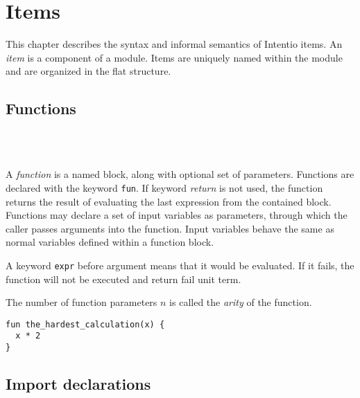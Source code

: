 \chapter{Items}

This chapter describes the syntax and informal semantics of Intentio items. An \emph{item} is a component of a module. Items are uniquely named within the module and are organized in the flat structure.

\begin{bnf}
   \eq    {}    
                \gorln {} 
\end{bnf}

\section{Functions}

\begin{bnf}
   \eq {} \  \ \term{(} \  \ \term{)} \  \\
   \eq {} \  \ \gtry{\term{,}}
\end{bnf}

A \emph{function} is a named block, along with optional set of parameters. Functions are declared with the keyword \lstinline{fun}. If keyword \emph{return} is not used, the function returns the result of evaluating the last expression from the contained block. Functions may declare a set of input variables as parameters, through which the caller passes arguments into the function. Input variables behave the same as normal variables defined within a function block.

A keyword \lstinline{expr} before argument means that it would be evaluated. If it fails, the function will not be executed and return fail unit term.

The number of function parameters $n$ is called the \emph{arity} of the function.

\begin{example}
\begin{lstlisting}
fun the_hardest_calculation(x) {
  x * 2
}
\end{lstlisting}
\end{example}

\section{Import declarations}

